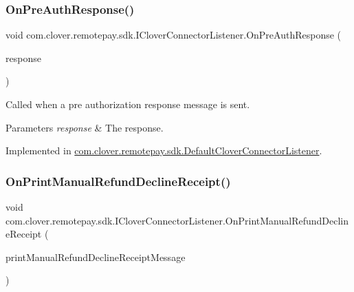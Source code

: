 \subsubsection{\texorpdfstring{On\+Pre\+Auth\+Response()}{OnPreAuthResponse()}}
{\footnotesize\ttfamily void com.\+clover.\+remotepay.\+sdk.\+I\+Clover\+Connector\+Listener.\+On\+Pre\+Auth\+Response (\begin{DoxyParamCaption}\item[{\hyperlink{classcom_1_1clover_1_1remotepay_1_1sdk_1_1_pre_auth_response}{Pre\+Auth\+Response}}]{response }\end{DoxyParamCaption})}



Called when a pre authorization response message is sent. 


\begin{DoxyParams}{Parameters}
{\em response} & The response.\\
\hline
\end{DoxyParams}


Implemented in \hyperlink{classcom_1_1clover_1_1remotepay_1_1sdk_1_1_default_clover_connector_listener_a780336c5a5388a0dc223e59f527e2f1d}{com.\+clover.\+remotepay.\+sdk.\+Default\+Clover\+Connector\+Listener}.

\mbox{\label{interfacecom_1_1clover_1_1remotepay_1_1sdk_1_1_i_clover_connector_listener_afb0b243842251d0fa8917d21b7b71246}} 
\subsubsection{\texorpdfstring{On\+Print\+Manual\+Refund\+Decline\+Receipt()}{OnPrintManualRefundDeclineReceipt()}}
{\footnotesize\ttfamily void com.\+clover.\+remotepay.\+sdk.\+I\+Clover\+Connector\+Listener.\+On\+Print\+Manual\+Refund\+Decline\+Receipt (\begin{DoxyParamCaption}\item[{\hyperlink{classcom_1_1clover_1_1remotepay_1_1sdk_1_1_print_manual_refund_decline_receipt_message}{Print\+Manual\+Refund\+Decline\+Receipt\+Message}}]{print\+Manual\+Refund\+Decline\+Receipt\+Message }\end{DoxyParamCaption})}




